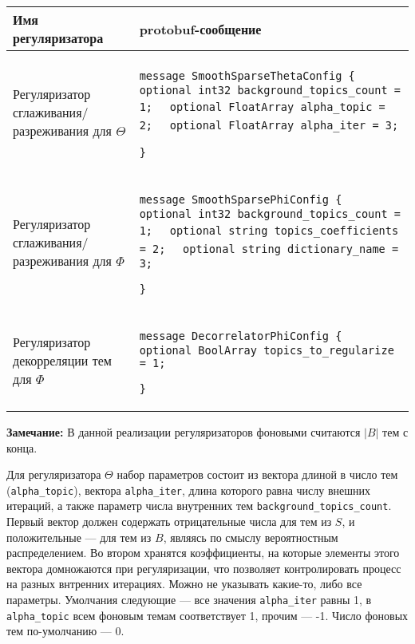 \begin{tabular}[t]{|p{14em}|p{26em}|}
\hline
\vspace{2pt} \textbf{Имя регуляризатора} \vspace{4pt} &
\vspace{2pt} \textbf{protobuf-сообщение} \vspace{4pt} \\

\hline
\vspace{4pt}

Регуляризатор сглаживания/ разреживания для $\Theta$ & 
\vspace{4pt}

\verb|message SmoothSparseThetaConfig {|
\verb|  optional int32 background_topics_count = 1;|
\verb|  optional FloatArray alpha_topic = 2;|
\verb|  optional FloatArray alpha_iter = 3;|

\verb|}|
\vspace{4pt}

\\
\hline
\vspace{4pt}

Регуляризатор сглаживания/ разреживания для $\Phi$ &
\vspace{4pt}

\verb|message SmoothSparsePhiConfig {|
\verb|  optional int32 background_topics_count = 1;|
\verb|  optional string topics_coefficients = 2;|
\verb|  optional string dictionary_name = 3;|

\verb|}|
\vspace{4pt}

\\
\hline

Регуляризатор декорреляции тем для $\Phi$ &
\vspace{4pt}

\verb|message DecorrelatorPhiConfig {|
\verb|  optional BoolArray topics_to_regularize = 1;|

\verb|}|
\vspace{4pt}

\\
\hline
\end{tabular}

\vspace{10pt}

{\bf Замечание:} В данной реализации регуляризаторов фоновыми считаются $|B|$ тем с конца.

Для регуляризатора $\Theta$ набор параметров состоит из вектора длиной в число тем (\verb|alpha_topic|), вектора \verb|alpha_iter|, длина которого равна числу внешних итераций, а также параметр числа внутренних тем \verb|background_topics_count|. Первый вектор должен содержать отрицательные числа для тем из $S$, и положительные --- для тем из $B$, являясь по смыслу вероятностным распределением. Во втором хранятся коэффициенты, на которые элементы этого вектора домножаются при регуляризации, что позволяет контролировать процесс на разных внтренних итерациях.
Можно не указывать какие-то, либо все параметры. Умолчания следующие --- все значения \verb|alpha_iter| равны 1, в \verb|alpha_topic| всем фоновым темам соответствует 1, прочим --- -1. Число фоновых тем по-умолчанию --- 0.

